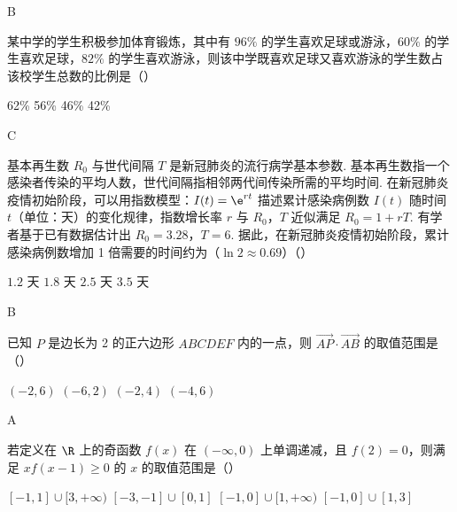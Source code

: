 \begin{answer}
B
\end{answer}

\begin{problem}
某中学的学生积极参加体育锻炼，其中有 \(96\%\) 的学生喜欢足球或游泳，\(60\%\) 的学生喜欢足球，\(82\%\) 的学生喜欢游泳，则该中学既喜欢足球又喜欢游泳的学生数占该校学生总数的比例是（\quad）

\choices
    {62\%}
    {56\%}
    {46\%}
    {42\%}
\end{problem}

\begin{answer}
C
\end{answer}

\begin{problem}
基本再生数 \(R_0\) 与世代间隔 \(T\) 是新冠肺炎的流行病学基本参数. 基本再生数指一个感染者传染的平均人数，世代间隔指相邻两代间传染所需的平均时间. 在新冠肺炎疫情初始阶段，可以用指数模型：\(I(t)=\e^{rt}\) 描述累计感染病例数 \(I(t)\) 随时间 \(t\)（单位：天）的变化规律，指数增长率 \(r\) 与 \(R_0\)，\(T\) 近似满足 \(R_0=1+rT\). 有学者基于已有数据估计出 \(R_0=3.28\)，\(T=6\). 据此，在新冠肺炎疫情初始阶段，累计感染病例数增加 1 倍需要的时间约为（\(\ln 2\approx 0.69\)）（\quad）

\choices
    {\(1.2\) 天}
    {\(1.8\) 天}
    {\(2.5\) 天}
    {\(3.5\) 天}
\end{problem}

\begin{answer}
B
\end{answer}

\begin{problem}
已知 \(P\) 是边长为 2 的正六边形 \(ABCDEF\) 内的一点，则 \(\overrightarrow{AP}\cdot\overrightarrow{AB}\) 的取值范围是（\quad）

\choices
    {\(\left( -2,6 \right)\)}
    {\(\left( -6,2 \right)\)}
    {\(\left( -2,4 \right)\)}
    {\(\left( -4,6 \right)\)}
\end{problem}

\begin{answer}
A
\end{answer}

\begin{problem}
若定义在 \(\R\) 上的奇函数 \(f(x)\) 在 \((-\infty,0)\) 上单调递减，且 \(f(2)=0\)，则满足 \(xf(x-1)\ge 0\) 的 \(x\) 的取值范围是（\quad）

\choices
    {\([ -1,1]\cup[3,+\infty)\)}
    {\([ -3,-1]\cup[0,1]\)}
    {\([ -1,0]\cup[1,+\infty)\)}
    {\([ -1,0]\cup[1,3]\)}
\end{problem}

